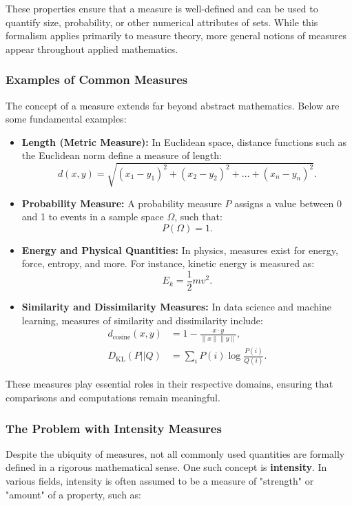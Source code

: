 \documentclass[12pt]{article}
\begin{document}
These properties ensure that a measure is well-defined and can be used to quantify size, probability, or other numerical attributes of sets. While this formalism applies primarily to measure theory, more general notions of measures appear throughout applied mathematics.

\subsubsection{Examples of Common Measures}

The concept of a measure extends far beyond abstract mathematics. Below are some fundamental examples:

\begin{itemize}
    \item \textbf{Length (Metric Measure):} In Euclidean space, distance functions such as the Euclidean norm define a measure of length:
    \[
    d(x, y) = \sqrt{(x_1 - y_1)^2 + (x_2 - y_2)^2 + \dots + (x_n - y_n)^2}.
    \]
    \item \textbf{Probability Measure:} A probability measure \( P \) assigns a value between 0 and 1 to events in a sample space \( \Omega \), such that:
    \[
    P(\Omega) = 1.
    \]
    \item \textbf{Energy and Physical Quantities:} In physics, measures exist for energy, force, entropy, and more. For instance, kinetic energy is measured as:
    \[
    E_k = \frac{1}{2} m v^2.
    \]
    \item \textbf{Similarity and Dissimilarity Measures:} In data science and machine learning, measures of similarity and dissimilarity include:
    \begin{align}
        d_{\text{cosine}}(x, y) &= 1 - \frac{x \cdot y}{\|x\| \|y\|}, \\
        D_{\text{KL}}(P || Q) &= \sum_i P(i) \log \frac{P(i)}{Q(i)}.
    \end{align}
\end{itemize}

These measures play essential roles in their respective domains, ensuring that comparisons and computations remain meaningful.

\subsubsection{The Problem with Intensity Measures}

Despite the ubiquity of measures, not all commonly used quantities are formally defined in a rigorous mathematical sense. One such concept is \textbf{intensity}. In various fields, intensity is often assumed to be a measure of "strength" or "amount" of a property, such as:
\end{document}
